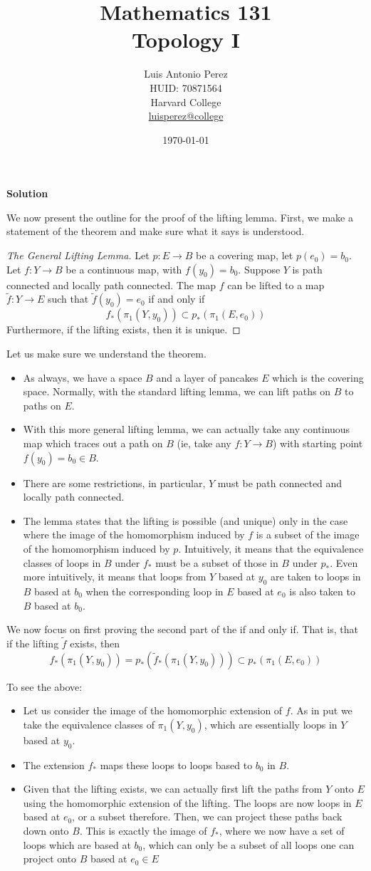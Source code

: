\documentclass[12pt]{article}
\title{Mathematics 131 \\
Topology I}
\author{
        Luis Antonio Perez \\
        HUID: 70871564 \\
        Harvard College \\
        \href{mailto:luisperez@college.harvard.edu}{luisperez@college}
}
\date{\today}
\newcounter{AnswerCounter}
\newcounter{SubAnswerCounter}
\newenvironment{answer}[0]{
  \setcounter{SubAnswerCounter}{1}
  \bigskip
  \textbf{Solution \arabic{AnswerCounter}}
  \\
  \begin{small}
}{
  \end{small}
  \stepcounter{AnswerCounter}
}
\begin{document}
\begin{answer}
We now present the outline for the proof of the lifting lemma. First, we make a statement of the theorem and make sure what it says is understood.
\begin{proof}[The General Lifting Lemma]
Let $p: E \to B$ be a covering map, let $p(e_0) = b_0$. Let $f: Y \to B$ be a continuous map, with $f(y_0) = b_0$. Suppose $Y$ is path connected and locally path connected. The map $f$ can be lifted to a map $\tilde{f} : Y \to E$ such that $\tilde{f}(y_0) = e_0$ if and only if
$$
f_*(\pi_1(Y,y_0)) \subset p_*(\pi_1(E,e_0))
$$
Furthermore, if the lifting exists, then it is unique.
\end{proof}
Let us make sure we understand the theorem.
\begin{itemize}
\item As always, we have a space $B$ and a layer of pancakes $E$ which is the covering space. Normally, with the standard lifting lemma, we can lift paths on $B$ to paths on $E$.
\item With this more general lifting lemma, we can actually take any continuous map which traces out a path on $B$ (ie, take any $f: Y \to B$) with starting point $f(y_0) = b_0 \in B$.
\item There are some restrictions, in particular, $Y$ must be path connected and locally path connected.
\item The lemma states that the lifting is possible (and unique) only in the case where the image of the homomorphism induced by $f$ is a subset of the image of the homomorphism induced by $p$. Intuitively, it means that the equivalence classes of loops in $B$ under $f_*$ must be a subset of those in $B$ under $p_*$. Even more intuitively, it means that loops from $Y$ based at $y_0$ are taken to loops in $B$ based at $b_0$ when the corresponding loop in $E$ based at $e_0$ is also taken to $B$ based at $b_0$.
\end{itemize}

We now focus on first proving the second part of the if and only if. That is, that if the lifting $\tilde{f}$ exists, then
$$
f_*(\pi_1(Y,y_0)) = p_*(\tilde{f}_*(\pi_1(Y,y_0))) \subset p_*(\pi_1(E,e_0))
$$

To see the above:
\begin{itemize}
\item Let us consider the image of the homomorphic extension of $f$. As in put we take the equivalence classes of $\pi_1(Y,y_0)$, which are essentially loops in $Y$ based at $y_0$.
\item The extension $f_*$ maps these loops to loops based to $b_0$ in $B$.
\item Given that the lifting exists, we can actually first lift the paths from $Y$ onto $E$ using the homomorphic extension of the lifting. The loops are now loops in $E$ based at $e_0$, or a subset therefore. Then, we can project these paths back down onto $B$. This is exactly the image of $f_*$, where we now have a set of loops which are based at $b_0$, which can only be a subset of all loops one can project onto $B$ based at $e_0 \in E$\end{itemize}


\end{answer}
\end{document}
